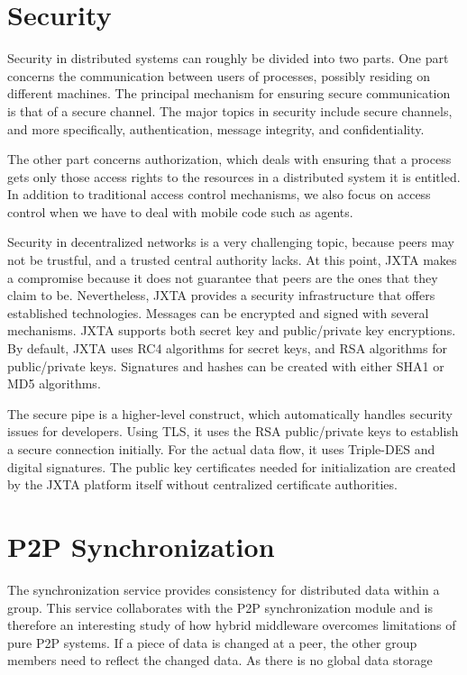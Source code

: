 \documentclass[twocolumn]{article}
\begin{document}
\section{Security}
Security in distributed systems can roughly be divided into two parts. One part concerns the communication between users  of processes, 
possibly residing on different machines. The principal mechanism for ensuring secure communication is that of a secure channel.
The major topics in security include secure channels, and more specifically, authentication, message integrity, and confidentiality.

The other part concerns authorization, which deals with ensuring that a process gets only those access rights to the resources in a distributed system it is entitled. In addition to traditional access control mechanisms, we also focus on access control when we have to deal with mobile code such as agents.

Security in decentralized networks is a very challenging topic, because peers may not be trustful, and a trusted central authority lacks. At this point, JXTA makes a compromise because it does not guarantee that peers are the ones that they claim to be. Nevertheless, JXTA provides a security infrastructure that offers established technologies. 
Messages can be encrypted and signed with several mechanisms. JXTA supports both secret key and public/private key encryptions. 
By default, JXTA uses RC4 algorithms for secret keys, and RSA algorithms for public/private keys. Signatures and hashes can be created with either SHA1 or MD5 algorithms. 

The secure pipe is a higher-level construct, which automatically handles security issues for developers. Using TLS, it uses the RSA public/private keys to establish a secure connection initially. For the actual data flow, it uses Triple-DES and digital signatures. 
The public key certificates needed for initialization are created by the JXTA platform itself without centralized certificate authorities.

\section{P2P Synchronization}
The synchronization service provides consistency for distributed data within a group. This service collaborates with the P2P synchronization module and is therefore an interesting study of how hybrid middleware overcomes limitations of pure P2P systems. If a piece of data is changed at a peer, the other group members need to reflect the changed data. As there is no global data storage
\end{document}
